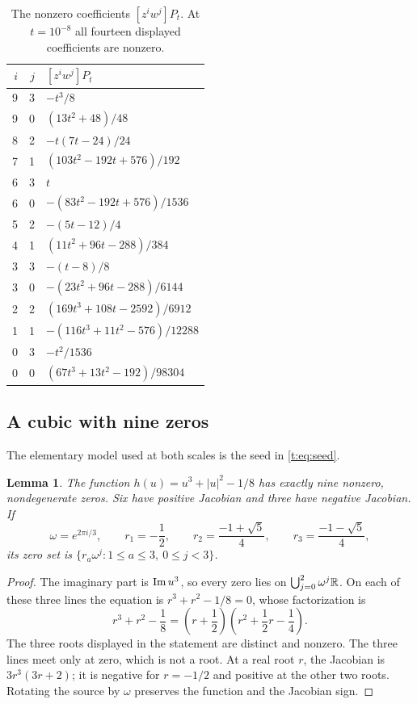 \documentclass[UTF8,11pt]{ctexart}
\newtheorem{lem}[thm]{Lemma}
\theoremstyle{definition}
\numberwithin{equation}{section}
\begin{document}
\begin{table}[htbp]
\centering
\caption{The nonzero coefficients $[z^iw^j]P_t$.
At $t=10^{-8}$ all fourteen displayed coefficients are nonzero.}
\label{t:tab:coefficients}
\renewcommand{\arraystretch}{1.22}
\begin{tabular}{rrl}
\toprule
$i$ & $j$ & $[z^iw^j]P_t$\\
\midrule
9&3&$-t^3/8$\\
9&0&$(13t^2+48)/48$\\
8&2&$-t(7t-24)/24$\\
7&1&$(103t^2-192t+576)/192$\\
6&3&$t$\\
6&0&$-(83t^2-192t+576)/1536$\\
5&2&$-(5t-12)/4$\\
4&1&$(11t^2+96t-288)/384$\\
3&3&$-(t-8)/8$\\
3&0&$-(23t^2+96t-288)/6144$\\
2&2&$(169t^3+108t-2592)/6912$\\
1&1&$-(116t^3+11t^2-576)/12288$\\
0&3&$-t^2/1536$\\
0&0&$(67t^3+13t^2-192)/98304$\\
\end{tabular}
\end{table}

\subsection{A cubic with nine zeros}

The elementary model used at both scales is the seed in
\eqref{t:eq:seed}.
\begin{lem}\label{t:lem:cubic}
The function $h(u)=u^3+|u|^2-1/8$ has exactly nine nonzero,
nondegenerate zeros. Six have positive Jacobian and three have negative
Jacobian. If
\[
 \omega=e^{2\pi i/3},\qquad
 r_1=-\frac12,\qquad
 r_2=\frac{-1+\sqrt5}{4},\qquad
 r_3=\frac{-1-\sqrt5}{4},
\]
its zero set is $\{r_a\omega^j:1\le a\le3,\ 0\le j<3\}$.
\end{lem}
\begin{proof}
The imaginary part is $\operatorname{Im} u^3$, so every zero lies on
$\bigcup_{j=0}^2\omega^j\mathbb R$. On each of these three lines the equation
is $r^3+r^2-1/8=0$, whose factorization is
\[
 r^3+r^2-\frac18
 =\left(r+\frac12\right)
  \left(r^2+\frac12r-\frac14\right).
\]
The three roots displayed in the statement are distinct and nonzero.
The three lines meet only at zero, which is not a root. At a real root
$r$, the Jacobian is $3r^3(3r+2)$; it is negative for $r=-1/2$ and
positive at the other two roots. Rotating the source by $\omega$
preserves the function and the Jacobian sign.
\end{proof}
\end{document}
